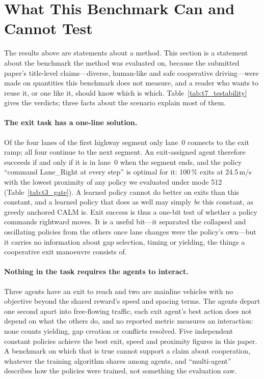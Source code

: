 \section{What This Benchmark Can and Cannot Test}
\label{sec:testability}

The results above are statements about a method. This section is a statement about the benchmark the method was evaluated on, because the submitted paper's title-level claims---diverse, human-like and safe cooperative driving---were made on quantities this benchmark does not measure, and a reader who wants to reuse it, or one like it, should know which is which. Table~\ref{tab:t7_testability} gives the verdicts; three facts about the scenario explain most of them.

\paragraph{The exit task has a one-line solution.}
Of the four lanes of the first highway segment only lane~0 connects to the exit ramp; all four continue to the next segment. An exit-assigned agent therefore succeeds if and only if it is in lane~0 when the segment ends, and the policy ``command Lane\_Right at every step'' is optimal for it: 100\,\% exits at 24.5\,m/s with the lowest proximity of any policy we evaluated under mode 512 (Table~\ref{tab:t3_gate}). A learned policy cannot do better on exits than this constant, and a learned policy that does as well may simply \emph{be} this constant, as greedy anchored CALM is. Exit success is thus a one-bit test of whether a policy commands rightward moves. It is a useful bit---it separated the collapsed and oscillating policies from the others once lane changes were the policy's own---but it carries no information about gap selection, timing or yielding, the things a cooperative exit manoeuvre consists of.

\paragraph{Nothing in the task requires the agents to interact.}
Three agents have an exit to reach and two are mainline vehicles with no objective beyond the shared reward's speed and spacing terms. The agents depart one second apart into free-flowing traffic, each exit agent's best action does not depend on what the others do, and no reported metric measures an interaction: none counts yielding, gap creation or conflicts resolved. Five independent constant policies achieve the best exit, speed and proximity figures in this paper. A benchmark on which that is true cannot support a claim about cooperation, whatever the training algorithm shares among agents, and ``multi-agent'' describes how the policies were trained, not something the evaluation saw.

